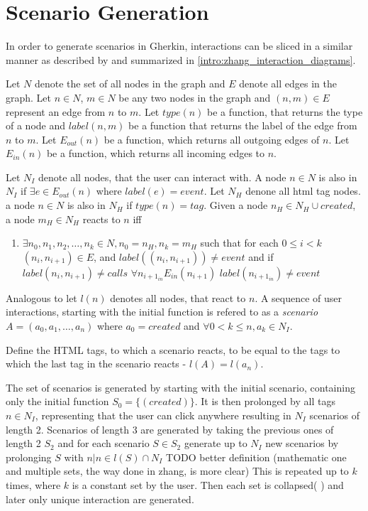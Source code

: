 \section{Scenario Generation}
In order to generate scenarios in Gherkin, interactions can be sliced in a similar manner as described by \textcite{zhang2019scenario} and summarized in \ref{intro:zhang_interaction_diagrams}.

Let $N$ denote the set of all nodes in the graph and $E$ denote all edges in the graph. Let $n \in N$, $m \in N$ be any two nodes in the graph and $(n, m) \in E $ represent an edge from $n$ to $m$. Let $type(n)$ be a function, that returns the type of a node and $label(n, m)$ be a function that returns the label of the edge from $n$ to $m$. Let $E_{out}(n)$ be a function, which returns all outgoing edges of $n$.
Let $E_{in}(n)$ be a function, which returns all incoming edges to $n$.

Let $N_I$ denote all nodes, that the user can interact with. A node $n \in N$ is also in $N_I$ if $\exists e \in E_{out}(n)$ where $label(e) = event$. Let $N_H$ denone all html tag nodes. a node $n \in N$ is also in $N_H$ if $type(n) = tag$. 
Given a node $n_H \in N_H \cup {created}$, a node $m_H \in N_H$ reacts to $n$ iff
\begin{enumerate}
    \item $\exists n_0,n_1,n_2, \ldots,n_k \in N, n_0=n_H,n_k=m_H$ such that for each $0 \leq i < k  $ $(n_i,n_{i+1}) \in E$, and $label((n_i,n_{i+1}))\neq event$ and if $label(n_i,n_{i+1}) \neq calls$ $\forall n_{i+1_{in}} E_{in}(n_{i+1})$ $label(n_{i+1_{in}}) \neq event$ 
\end{enumerate}

Analogous to \cite{zhang2019scenario} let $l(n)$ denotes all nodes, that react to $n$. A sequence of user interactions, starting with the initial function is refered to as a \textit{scenario} $A=(a_0,a_1,\ldots, a_n)$ where $a_0=created$ and $\forall0 < k \leq n, a_k \in N_I$. 

Define the HTML tags, to which a scenario reacts, to be equal to the tags to which the last tag in the scenario reacts 
- $l(A)=l(a_n)$. 


The set of scenarios is generated by starting with the initial scenario, containing only the initial function $S_0 = \{(created)\}$. It is then prolonged by all tags $n \in N_I$, representing that the user can click anywhere resulting in $N_I$ scenarios of length 2. Scenarios of length 3 are generated by taking the previous ones of length 2 $S_2$ and for each scenario $S \in S_2$ generate up to $N_I$ new scenarios by prolonging $S$ with $n | n \in l(S) \cap N_I$
TODO better definition (mathematic one and multiple sets, the way done in zhang, is more clear)
This is repeated up to $k$ times, where $k$ is a constant set by the user. Then each set is collapsed(%
) and later only unique interaction are generated.

